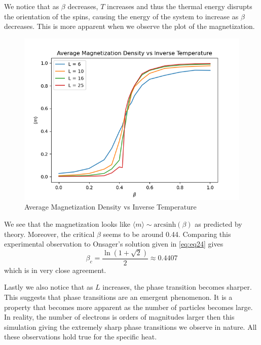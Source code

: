 \documentclass{article}
\begin{document}
We notice that as $\beta$ decreases, $T$ increases and thus the thermal energy disrupts the orientation of the spins, causing
the energy of the system to increase as $\beta$ decreases. This is more apparent when we observe the plot of the magnetization.

\begin{figure}[ht]
    \includegraphics[width=\columnwidth]{plots/avg_mag_vs_beta.png}
    \caption{Average Magnetization Density vs Inverse Temperature}
    \label{fig:4}
\end{figure}

We see that the magnetization looks like $\langle m \rangle \sim \mathrm{arcsinh}(\beta)$ as predicted by theory. 
Moreover, the critical $\beta$ seems to be around 0.44. Comparing this experimental observation to Onsager's solution given 
in \eqref{eq:eq24} gives 
\begin{equation}
    \beta_c = \frac{\ln(1+\sqrt{2})}{2} \approx 0.4407
\end{equation}
which is in very close agreement. 

Lastly we also notice that as $L$ increases, the phase transition becomes sharper. This suggests that phase transitions are
an emergent phenomenon. It is a property that becomes more apparent as the number of particles becomes large. In reality, the number of electrons is orders of magnitudes larger then this simulation giving the extremely sharp 
phase transitions we observe in nature. All these observations hold true for the specific heat.
\end{document}
